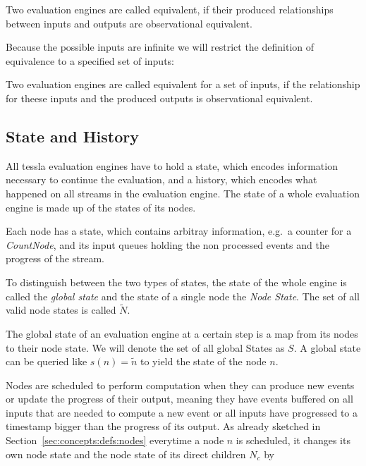 \begin{definition}[name=Equivalence of Evaluation Engines]\label{def:equivalence_eval_engine}
  Two evaluation engines are called equivalent, if their produced relationships between inputs and outputs are observational equivalent.
\end{definition}

Because the possible inputs are infinite we will restrict the definition of equivalence to a specified set of inputs:

\begin{definition}[name=Equivalence of Evaluation Engines for Specified Inputs]\label{def:equivalence_eval_engine_specific_inputs}
  Two evaluation engines are called equivalent for a set of inputs, if the relationship for theese inputs and the produced outputs is observational equivalent.
\end{definition}


\subsection{State and History}
\label{sec:concepts:def:state}

All \gls{tessla} evaluation engines have to hold a state, which encodes information necessary to continue the evaluation, and a history, which encodes what happened on all streams in the evaluation engine.
The state of a whole evaluation engine is made up of the states of its nodes.

Each node has a state, which contains arbitray information, e.g.\ a counter for a \emph{CountNode}, and its input queues holding the non processed events and the progress of the stream.

To distinguish between the two types of states, the state of the whole engine is called the \emph{global state} and the state of a single node the \emph{Node State}.
The set of all valid node states is called \(\widetilde{N}\).

The global state of an evaluation engine at a certain step is a map from its nodes to their node state.
We will denote the set of all global States as \(S\).
A global state can be queried like \(s(n) = \widetilde{n}\) to yield the state of the node \(n\).

Nodes are scheduled to perform computation when they can produce new events or update the progress of their output, meaning they have events buffered on all inputs that are needed to compute a new event or all inputs have progressed to a timestamp bigger than the progress of its output.
As already sketched in Section~\ref{sec:concepts:defs:nodes} everytime a node \(n\) is scheduled, it changes its own node state and the node state of its direct children \(N_c\) by

